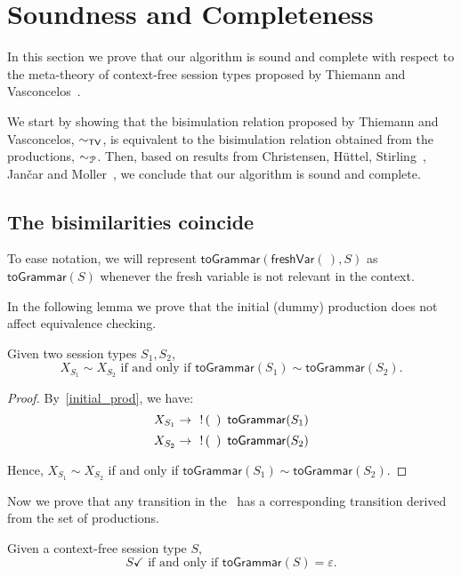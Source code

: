 
\section{Soundness and Completeness}
\label{sec:soundness}

In this section we prove that our algorithm is sound and complete 
with respect to the meta-theory of context-free session types proposed 
by Thiemann and Vasconcelos~\cite{thiemann2016context}.

We start by showing that the bisimulation relation proposed by 
Thiemann and Vasconcelos, $\sim_{\mathsf{TV}}$, is equivalent to the 
bisimulation relation obtained from the productions, $\sim_{\mathcal{P}}$. 
Then, based on results from Christensen, H{\"{u}}ttel, 
Stirling~\cite{DBLP:journals/iandc/ChristensenHS95}, Jan{\v{c}}ar 
and Moller~\cite{janvcar1999techniques}, we conclude that our algorithm 
is sound and complete.

\subsection{The bisimilarities coincide}

To ease notation, we will represent $\mathsf{toGrammar}
(\mathsf{freshVar}(\,),S)$ as $\mathsf{toGrammar}(S)$ whenever 
the fresh variable is not relevant in the context.

In the following lemma we prove that the initial (dummy) production 
does not affect equivalence checking.
\begin{lemma}
	Given two session types $S_1, S_2$, 
	\[ X_{S_1} \sim X_{S_2}  \text{ if and only if } 
	\mathsf{toGrammar}(S_1) \sim \mathsf{toGrammar}(S_2).\]
\end{lemma}

\begin{proof}
	By~\eqref{initial_prod}, we have:
	\[ X_{S_1}  \rightarrow \enspace \,!\, ( \enspace )\enspace \mathsf{toGrammar}(S_1) 	\]
    \[ X_{S_2}  \rightarrow \enspace \,!\, ( \enspace )\enspace \mathsf{toGrammar}(S_2) 	\]

Hence, $X_{S_1}\sim X_{S_2}$ if and only if 
$\mathsf{toGrammar}(S_1) \sim \mathsf{toGrammar}(S_2)$.
\end{proof}

Now we prove that any transition in the \LTS\ has a 
corresponding transition derived from the set of productions.

\begin{lemma}
\label{lemma:terminated_session}
	Given a context-free session type $S$, 
	\[S \checkmark \text{ if and only if } \mathsf{toGrammar}(S) = \varepsilon.\]
\end{lemma}

